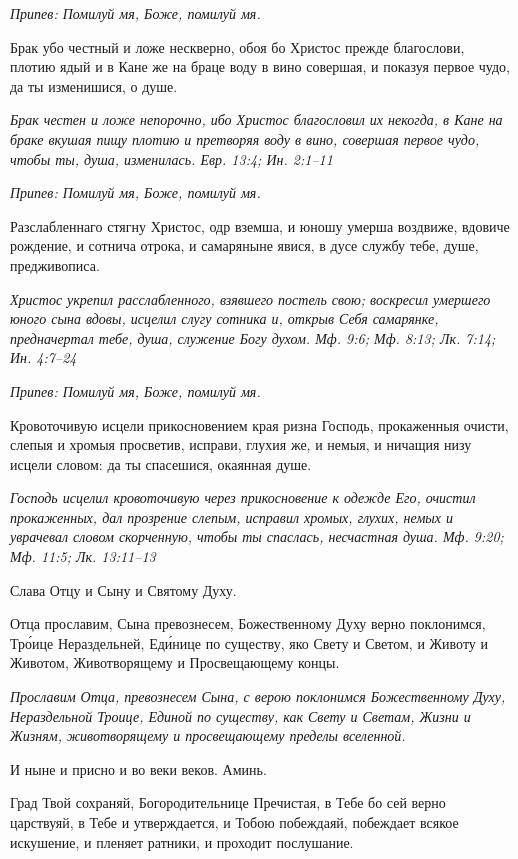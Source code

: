 \itshape Припев:\normalfont{} Помилуй мя, Боже, помилуй мя.


Брак убо честный и ложе нескверно, обоя бо Христос прежде благослови, плотию ядый и в Кане же на браце воду в вино совершая, и показуя первое чудо, да ты изменишися, о душе.


\itshape Брак честен и ложе непорочно, ибо Христос благословил их некогда, в Кане на браке вкушая пищу плотию и претворяя воду в вино, совершая первое чудо, чтобы ты, душа, изменилась. Евр. 13:4; Ин. 2:1–11\normalfont{}


\itshape Припев:\normalfont{} Помилуй мя, Боже, помилуй мя.


Разслабленнаго стягну Христос, одр вземша, и юношу умерша воздвиже, вдовиче рождение, и сотнича отрока, и самаряныне явися, в дусе службу тебе, душе, предживописа.


\itshape Христос укрепил расслабленного, взявшего постель свою; воскресил умершего юного сына вдовы, исцелил слугу сотника и, открыв Себя самарянке, предначертал тебе, душа, служение Богу духом. Мф. 9:6; Мф. 8:13; Лк. 7:14; Ин. 4:7–24\normalfont{}


\itshape Припев:\normalfont{} Помилуй мя, Боже, помилуй мя.


Кровоточивую исцели прикосновением края ризна Господь, прокаженныя очисти, слепыя и хромыя просветив, исправи, глухия же, и немыя, и ничащия низу исцели словом: да ты спасешися, окаянная душе.


\itshape Господь исцелил кровоточивую через прикосновение к одежде Его, очистил прокаженных, дал прозрение слепым, исправил хромых, глухих, немых и уврачевал словом скорченную, чтобы ты спаслась, несчастная душа. Мф. 9:20; Мф. 11:5; Лк. 13:11–13\normalfont{}


Слава Отцу и Сыну и Святому Духу.


Отца прославим, Сына превознесем, Божественному Духу верно поклонимся, Тро́ице Нераздельней, Еди́нице по существу, яко Свету и Светом, и Животу и Животом, Животворящему и Просвещающему концы.


\itshape Прославим Отца, превознесем Сына, с верою поклонимся Божественному Духу, Нераздельной Троице, Единой по существу, как Свету и Светам, Жизни и Жизням, животворящему и просвещающему пределы вселенной.\normalfont{}


И ныне и присно и во веки веков. Аминь.


Град Твой сохраняй, Богородительнице Пречистая, в Тебе бо сей верно царствуяй, в Тебе и утверждается, и Тобою побеждаяй, побеждает всякое искушение, и пленяет ратники, и проходит послушание.



